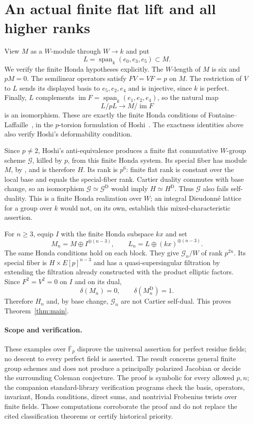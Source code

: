 \documentclass[10pt]{article}
\newcommand{\im}{\operatorname{im}}
\newcommand{\Span}{\operatorname{span}}
\newcommand{\dual}{\mathrm D}
\begin{document}
\section{An actual finite flat lift and all higher ranks}
View $M$ as a $W$-module through $W\to k$ and put
\[
 L=\Span_k(e_0,e_3,e_5)\subset M.
\]
We verify the finite Honda hypotheses explicitly. The $W$-length of
$M$ is six and $pM=0$. The semilinear operators satisfy $FV=VF=p$
on $M$. The restriction of $V$ to $L$ sends its displayed basis
to $e_5,e_2,e_4$ and is injective, since $k$ is perfect. Finally,
$L$ complements $\im F=\Span_k(e_1,e_2,e_4)$, so the natural map
\[
 L/pL\longrightarrow M/\im F
\]
is an isomorphism. These are exactly the finite Honda conditions
of Fontaine--Laffaille~\cite[\S9.4]{FontaineLaffaille}, in the
$p$-torsion formulation of Hoshi~\cite[Remark~3.5.1]{Hoshi}.
The exactness identities above also verify Hoshi's deformability
condition.

Since $p\ne2$, Hoshi's anti-equivalence
\cite[Proposition~3.11(2)]{Hoshi} produces a finite flat commutative
$W$-group scheme $\mathcal G$, killed by $p$, from this finite Honda
system. Its special fiber has module $M$, by
\cite[Proposition~3.11(5)]{Hoshi}, and is therefore $H$.
Its rank is $p^6$: finite flat rank is constant over the local base
and equals the special-fiber rank. Cartier duality commutes with
base change, so an isomorphism $\mathcal G\simeq\mathcal G^{\dual}$
would imply $H\simeq H^{\dual}$. Thus $\mathcal G$ also fails
self-duality. This is a finite Honda realization over $W$; an
integral Dieudonn\'e lattice for a group over $k$ would not, on
its own, establish this mixed-characteristic assertion.

For $n\geq3$, equip $I$ with the finite Honda subspace $kx$ and set
\[
 M_n=M\oplus I^{\oplus(n-3)},\qquad
 L_n=L\oplus(kx)^{\oplus(n-3)}.
\]
The same Honda conditions hold on each block. They give
$\mathcal G_n/W$ of rank $p^{2n}$. Its special fiber is
$H\times E[p]^{n-3}$ and has a quasi-supersingular filtration by
extending the filtration already constructed with the product
elliptic factors. Since $F^2=V^2=0$ on $I$ and on its dual,
\[
 \delta(M_n)=0,\qquad\delta(M_n^{\dual})=1.
\]
Therefore $H_n$ and, by base change, $\mathcal G_n$ are not
Cartier self-dual. This proves Theorem~\ref{thm:main}.

\paragraph{Scope and verification.}
These examples over $\overline{\mathbb F}_p$ disprove the universal
assertion for perfect residue fields; no descent to every perfect
field is asserted. The result concerns general finite group schemes
and does not produce a principally polarized Jacobian or decide
the surrounding Coleman conjecture. The proof is symbolic for
every allowed $p,n$; the companion standard-library verification
programs check the basis, operators, invariant, Honda conditions,
direct sums, and nontrivial Frobenius twists over finite fields.
Those computations corroborate the proof and do not replace the
cited classification theorems or certify historical priority.
\end{document}
